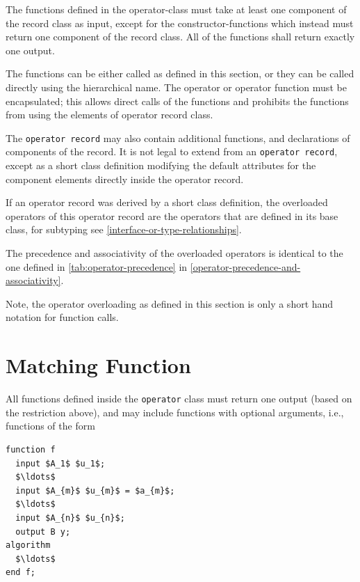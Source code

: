 The functions defined in the operator-class must take at least one component of the record class as input, except for the constructor-functions which instead must return one component of the record class.
All of the functions shall return exactly one output.

The functions can be either called as defined in this section, or they can be called directly using the hierarchical name.
The operator or operator function must be encapsulated; this allows direct calls of the functions and prohibits the functions from using the elements of operator record class.

The \lstinline!operator record! may also contain additional functions, and declarations of components of the record.
It is not legal to extend from an \lstinline!operator record!, except as a short class definition modifying the default attributes for the component elements directly inside the operator record.

If an operator record was derived by a short class definition, the overloaded operators of this operator record are the operators that are defined in its base class, for subtyping see \cref{interface-or-type-relationships}.

The precedence and associativity of the overloaded operators is identical to the one defined in \cref{tab:operator-precedence} in \cref{operator-precedence-and-associativity}.

\begin{nonnormative}
Note, the operator overloading as defined in this section is only a short hand notation for function calls.
\end{nonnormative}

\section{Matching Function}\label{matching-function}

All functions defined inside the \lstinline!operator! class must return one output (based on the restriction above), and may include functions with optional arguments, i.e., functions of the form
\begin{lstlisting}[language=modelica]
function f
  input $A_1$ $u_1$;
  $\ldots$
  input $A_{m}$ $u_{m}$ = $a_{m}$;
  $\ldots$
  input $A_{n}$ $u_{n}$;
  output B y;
algorithm
  $\ldots$
end f;
\end{lstlisting}

